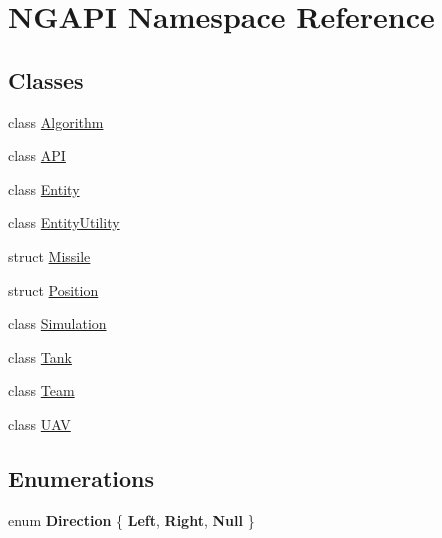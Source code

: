 \hypertarget{namespace_n_g_a_p_i}{}\section{N\+G\+A\+PI Namespace Reference}
\label{namespace_n_g_a_p_i}
\subsection*{Classes}
\begin{DoxyCompactItemize}
\item 
class \hyperlink{class_n_g_a_p_i_1_1_algorithm}{Algorithm}
\item 
class \hyperlink{class_n_g_a_p_i_1_1_a_p_i}{A\+PI}
\item 
class \hyperlink{class_n_g_a_p_i_1_1_entity}{Entity}
\item 
class \hyperlink{class_n_g_a_p_i_1_1_entity_utility}{Entity\+Utility}
\item 
struct \hyperlink{struct_n_g_a_p_i_1_1_missile}{Missile}
\item 
struct \hyperlink{struct_n_g_a_p_i_1_1_position}{Position}
\item 
class \hyperlink{class_n_g_a_p_i_1_1_simulation}{Simulation}
\item 
class \hyperlink{class_n_g_a_p_i_1_1_tank}{Tank}
\item 
class \hyperlink{class_n_g_a_p_i_1_1_team}{Team}
\item 
class \hyperlink{class_n_g_a_p_i_1_1_u_a_v}{U\+AV}
\end{DoxyCompactItemize}
\subsection*{Enumerations}
\begin{DoxyCompactItemize}
\item 
\mbox{\label{namespace_n_g_a_p_i_a505c4e8af373b06d1240e4ce7719e8a2}} 
enum {\bfseries Direction} \{ {\bfseries Left}, 
{\bfseries Right}, 
{\bfseries Null}
 \}
\end{DoxyCompactItemize}
